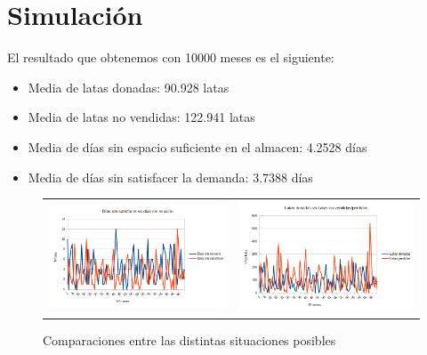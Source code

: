 \documentclass[11pt,a4paper]{report}
\begin{document}
\section{Simulación}
El resultado que obtenemos con 10000 meses es el siguiente:
\begin{itemize}
	\item{Media de latas donadas: 90.928 latas}
	\item{Media de latas no vendidas: 122.941 latas}
	\item{Media de días sin espacio suficiente en el almacen: 4.2528 días}
	\item{Media de días sin satisfacer la demanda: 3.7388 días}
\end{itemize}

\begin{figure}[H]
\begin{tabular}{ll}
\includegraphics[scale=0.25]{img/dias_sin_espacio_satisfacer.png}
&
\includegraphics[scale=0.25]{img/no_vendidas_donadas.png}
\end{tabular}
\caption{Comparaciones entre las distintas situaciones posibles}
\end{figure}
\end{document}
